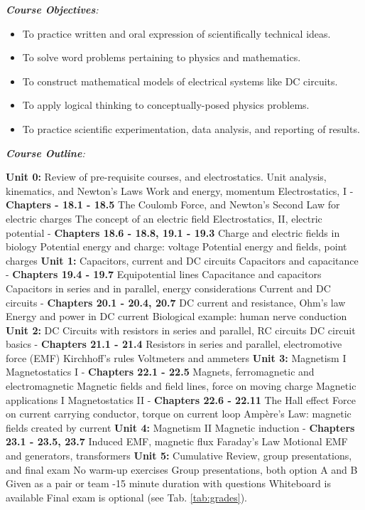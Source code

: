 \documentclass[10pt]{article}
\begin{document}
\noindent
\textit{\textbf{Course Objectives}:}
\begin{itemize}
\item To practice written and oral expression of scientifically technical ideas.
\item To solve word problems pertaining to physics and mathematics.
\item To construct mathematical models of electrical systems like DC circuits.
\item To apply logical thinking to conceptually-posed physics problems.
\item To practice scientific experimentation, data analysis, and reporting of results.
\end{itemize}

\textit{\textbf{Course Outline}:}
\begin{outline}[enumerate]
\1 \textbf{Unit 0:} Review of pre-requisite courses, and electrostatics.
\2 Unit analysis, kinematics, and Newton's Laws
\2 Work and energy, momentum
\2 Electrostatics, I - \textbf{Chapters - 18.1 - 18.5}
\3 The Coulomb Force, and Newton's Second Law for electric charges
\3 The concept of an electric field
\2 Electrostatics, II, electric potential - \textbf{Chapters 18.6 - 18.8, 19.1 - 19.3}
\3 Charge and electric fields in biology
\3 Potential energy and charge: voltage
\3 Potential energy and fields, point charges
\1 \textbf{Unit 1:} Capacitors, current and DC circuits
\2 Capacitors and capacitance - \textbf{Chapters 19.4 - 19.7}
\3 Equipotential lines
\3 Capacitance and capacitors
\3 Capacitors in series and in parallel, energy considerations
\2 Current and DC circuits - \textbf{Chapters 20.1 - 20.4, 20.7}
\3 DC current and resistance, Ohm's law
\3 Energy and power in DC current
\3 Biological example: human nerve conduction
\1 \textbf{Unit 2:} DC Circuits with resistors in series and parallel, RC circuits
\2 DC circuit basics - \textbf{Chapters 21.1 - 21.4}
\3 Resistors in series and parallel, electromotive force (EMF)
\3 Kirchhoff's rules
\3 Voltmeters and ammeters
\1 \textbf{Unit 3:} Magnetism I
\2 Magnetostatics I - \textbf{Chapters 22.1 - 22.5}
\3 Magnets, ferromagnetic and electromagnetic
\3 Magnetic fields and field lines, force on moving charge
\3 Magnetic applications I
\2 Magnetostatics II - \textbf{Chapters 22.6 - 22.11}
\3 The Hall effect
\3 Force on current carrying conductor, torque on current loop
\3 Amp\`{e}re's Law: magnetic fields created by current
\1 \textbf{Unit 4:} Magnetism II
\2 Magnetic induction - \textbf{Chapters 23.1 - 23.5, 23.7}
\3 Induced EMF, magnetic flux
\3 Faraday's Law
\3 Motional EMF and generators, transformers
\1 \textbf{Unit 5:} Cumulative Review, group presentations, and final exam
\2 No warm-up exercises
\2 Group presentations, both option A and B
\3 Given as a pair or team
-15 minute duration with questions
\3 Whiteboard is available
\3 Final exam is optional (see Tab. \ref{tab:grades}).
\end{outline}
\end{document}
